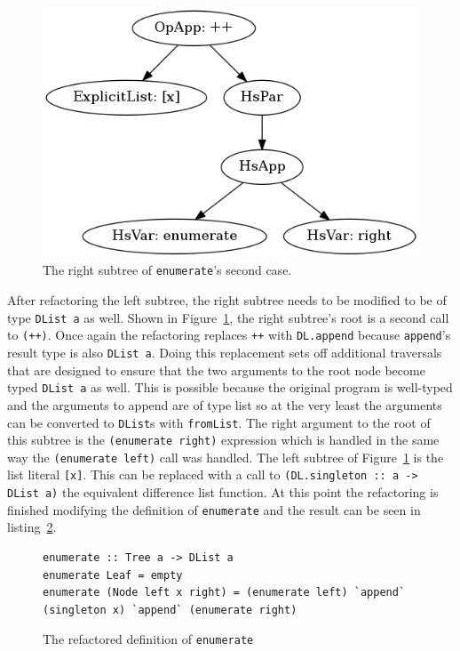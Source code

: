 \begin{figure}[h]
	\begin{center}
		\includegraphics[scale=.5]{graphVis/Chapter3/enumRight.png}
	\end{center}
	\caption{The right subtree of \texttt{enumerate}'s second case.}
	\label{enumRight}
\end{figure}
\pagebreak
After refactoring the left subtree, the right subtree needs to be modified to be of type \texttt{DList a} as well. Shown in Figure~\ref{enumRight}, the right subtree's root is a second call to \texttt{(++)}. Once again the refactoring replaces \texttt{++} with \texttt{DL.append} because \texttt{append}'s result type is also \texttt{DList a}. Doing this replacement sets off additional traversals that are designed to ensure that the two arguments to the root node become typed \texttt{DList a} as well. This is possible because the original program is well-typed and the arguments to append are of type list so at the very least the arguments can be converted to \texttt{DList}s with \texttt{fromList}. The right argument to the root of this subtree is the \texttt{(enumerate right)} expression which is handled in the same way the \texttt{(enumerate left)} call was handled. The left subtree of Figure~\ref{enumRight}  is the list literal \texttt{[x]}. This can be replaced with a call to \texttt{(DL.singleton :: a -> DList a)} the equivalent difference list function. At this point the refactoring is finished modifying the definition of \texttt{enumerate} and the result can be seen in listing~\ref{enumRef}.

\begin{figure}[t]
\begin{lstlisting}
enumerate :: Tree a -> DList a
enumerate Leaf = empty
enumerate (Node left x right) = (enumerate left) `append` (singleton x) `append` (enumerate right)
\end{lstlisting}
\caption{The refactored definition of \texttt{enumerate}}
\label{enumRef}
\end{figure}

